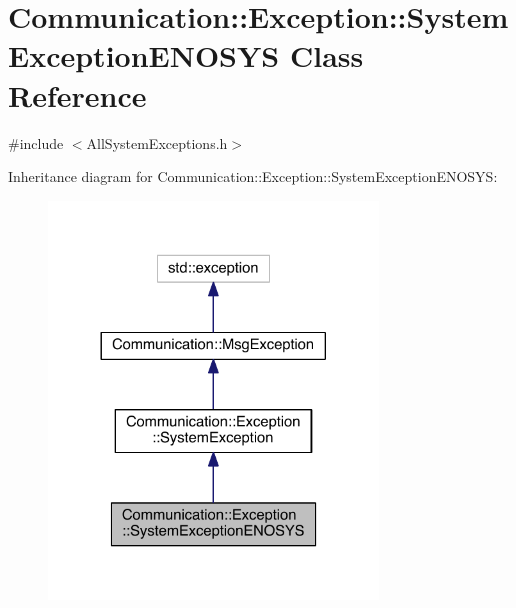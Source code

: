 \hypertarget{class_communication_1_1_exception_1_1_system_exception_e_n_o_s_y_s}{}\section{Communication\+:\+:Exception\+:\+:System\+Exception\+E\+N\+O\+S\+Y\+S Class Reference}
\label{class_communication_1_1_exception_1_1_system_exception_e_n_o_s_y_s}


{\ttfamily \#include $<$All\+System\+Exceptions.\+h$>$}



Inheritance diagram for Communication\+:\+:Exception\+:\+:System\+Exception\+E\+N\+O\+S\+Y\+S\+:\nopagebreak
\begin{figure}[H]
\begin{center}
\leavevmode
\includegraphics[width=248pt]{class_communication_1_1_exception_1_1_system_exception_e_n_o_s_y_s__inherit__graph}
\end{center}
\end{figure}



